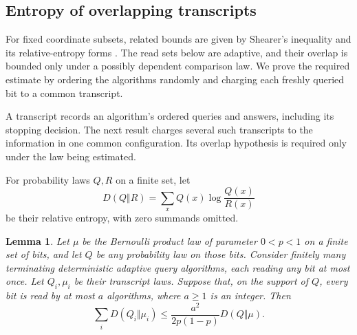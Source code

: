 \documentclass[11pt]{article}
\newtheorem{lemma}[theorem]{Lemma}
\theoremstyle{definition}
\begin{document}
\subsection{Entropy of overlapping transcripts}

For fixed coordinate subsets, related bounds are given by Shearer's
inequality \cite{ChungGrahamFranklShearer1986} and its relative-entropy
forms \cite[Section~IX]{MadimanTetali2010}. The read sets below are
adaptive, and their overlap is bounded only under a possibly dependent
comparison law.
We prove the required estimate by ordering the algorithms randomly
and charging each freshly queried bit to a common transcript.

A transcript records an algorithm's ordered queries and answers,
including its stopping decision. The next result charges several such
transcripts to the information in one common configuration. Its
overlap hypothesis is required only under the law being estimated.

For probability laws $Q,R$ on a finite set, let
\[
 D(Q\Vert R)=\sum_x Q(x)\log\frac{Q(x)}{R(x)}
\]
be their relative entropy, with zero summands omitted.

\begin{lemma}\label{lem:entropy}
Let $\mu$ be the Bernoulli product law of parameter $0<p<1$ on
a finite set of bits, and let $Q$ be any probability law on those bits.
Consider finitely many terminating deterministic adaptive query algorithms, each
reading any bit at most once. Let $Q_i,\mu_i$ be their transcript
laws. Suppose that, on the support of $Q$, every bit is read by at
most $a$ algorithms, where $a\ge1$ is an integer. Then
\[
 \sum_iD(Q_i\Vert\mu_i)
 \le\frac{a^2}{2p(1-p)}D(Q\Vert\mu).
\]
\end{lemma}
\end{document}
